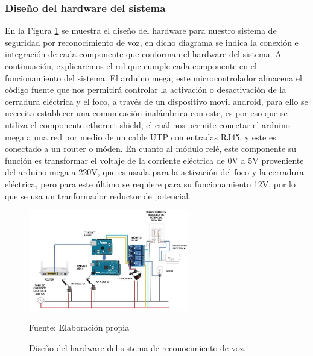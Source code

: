 \subsubsection{Diseño del hardware del sistema}
En la Figura \ref{fig:figura3.69} se muestra el diseño del hardware para nuestro sistema de seguridad por reconocimiento de voz, en dicho diagrama se indica la conexión e integración de cada componente que conforman el hardware del sistema.
\vskip 0.5cm
A continuación, explicaremos el rol que cumple cada componente en el funcionamiento del sistema. El arduino mega, este microcontrolador almacena el código fuente que nos permitirá controlar la activación o desactivación de la cerradura eléctrica y el foco, a través de un dispositivo movil android, para ello se nececita establecer una comunicación inalámbrica con este, es por eso que se utiliza el componente ethernet shield, el cuál nos permite conectar el arduino mega a una red por medio de un cable UTP con entradas RJ45, y este es conectado a un router o móden.
\vskip 0.5cm
En cuanto al módulo relé, este componente su función es transformar el voltaje de la corriente eléctrica de 0V a 5V proveniente del arduino mega a 220V, que es usada para la activación del foco y la cerradura eléctrica, pero para este último se requiere para su funcionamiento 12V, por lo que se usa un tranformador reductor de potencial.
\begin{figure}[H]
\captionsetup{justification=centering}
\begin{center}
\includegraphics[width=0.62\textwidth]{Imagenes/Cap3/image069}
\end{center}
\begin{center}
\vskip -0.5cm
\caption{\small{Diseño del hardware del sistema de reconocimiento de voz.}}
\label{fig:figura3.69}
{\small{Fuente: Elaboración propia}}
\end{center}
\end{figure}

